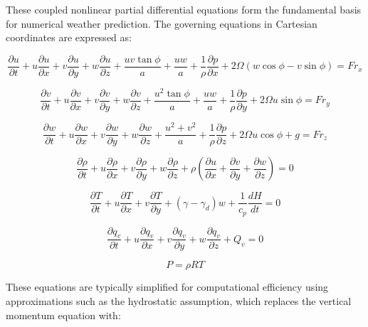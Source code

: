 \documentclass{article}
\begin{document}
These coupled nonlinear partial differential equations form the fundamental basis for numerical weather prediction. The governing equations in Cartesian coordinates are expressed as:

\begin{equation}
\frac{\partial u}{\partial t} + u\frac{\partial u}{\partial x} + v\frac{\partial u}{\partial y} + w\frac{\partial u}{\partial z} + \frac{uv\tan\phi}{a} + \frac{uw}{a} + \frac{1}{\rho}\frac{\partial p}{\partial x} + 2\Omega(w\cos\phi - v\sin\phi) = Fr_x
\end{equation}

\begin{equation}
\frac{\partial v}{\partial t} + u\frac{\partial v}{\partial x} + v\frac{\partial v}{\partial y} + w\frac{\partial v}{\partial z} + \frac{u^2\tan\phi}{a} + \frac{uw}{a} + \frac{1}{\rho}\frac{\partial p}{\partial y} + 2\Omega u\sin\phi = Fr_y
\end{equation}

\begin{equation}
\frac{\partial w}{\partial t} + u\frac{\partial w}{\partial x} + v\frac{\partial w}{\partial y} + w\frac{\partial w}{\partial z} + \frac{u^2 + v^2}{a} + \frac{1}{\rho}\frac{\partial p}{\partial z} + 2\Omega u\cos\phi + g = Fr_z
\end{equation}

\begin{equation}
\frac{\partial \rho}{\partial t} + u\frac{\partial \rho}{\partial x} + v\frac{\partial \rho}{\partial y} + w\frac{\partial \rho}{\partial z} + \rho\left(\frac{\partial u}{\partial x} + \frac{\partial v}{\partial y} + \frac{\partial w}{\partial z}\right) = 0
\end{equation}

\begin{equation}
\frac{\partial T}{\partial t} + u\frac{\partial T}{\partial x} + v\frac{\partial T}{\partial y} + (\gamma - \gamma_d)w + \frac{1}{c_p}\frac{dH}{dt} = 0
\end{equation}

\begin{equation}
\frac{\partial q_v}{\partial t} + u\frac{\partial q_v}{\partial x} + v\frac{\partial q_v}{\partial y} + w\frac{\partial q_v}{\partial z} + Q_v = 0
\end{equation}

\begin{equation}
P = \rho RT
\end{equation}

These equations are typically simplified for computational efficiency using approximations such as the hydrostatic assumption, which replaces the vertical momentum equation with:
\end{document}
